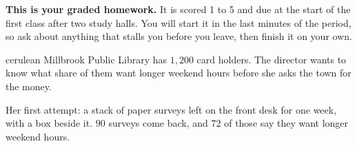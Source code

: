 \documentclass[12pt]{article}
\begin{document}

\vspace{0.12in}

\begin{remindbox}
\small
\textbf{This is your graded homework.} It is scored 1 to 5 and due at the start of the
first class after two study halls. You will start it in the last minutes of the period, so ask about anything that stalls
you before you leave, then finish it on your own.
\end{remindbox}

\vspace{0.08in}

\boxguard[20]
\begin{scenariobox}{cerulean}
Millbrook Public Library has $1{,}200$ card holders. The director wants to know what share of
them want longer weekend hours before she asks the town for the money.

\vspace{2pt}
Her first attempt: a stack of paper surveys left on the front desk for one week, with a box
beside it. $90$ surveys come back, and $72$ of those say they want longer weekend hours.
\end{scenariobox}

\vspace{0.08in}
\end{document}
